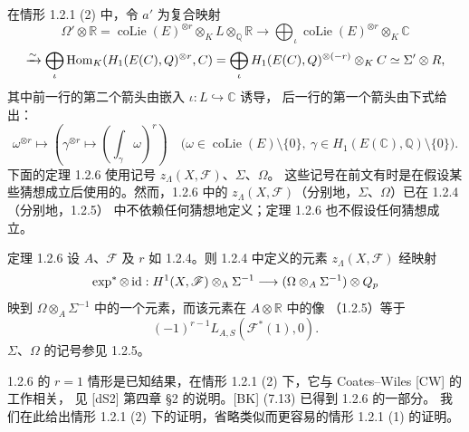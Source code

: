 在情形 1.2.1 (2) 中，令 $a'$ 为复合映射
\[
\Omega'\otimes\mathbb R=\operatorname{coLie}(E)^{\otimes r}\otimes_KL\otimes_{\mathbb Q}\mathbb R
\longrightarrow\bigoplus_\iota\operatorname{coLie}(E)^{\otimes r}\otimes_K\mathbb C
\]
\[
\xrightarrow{\sim}\bigoplus_\iota\operatorname{Hom}_K(H_1(E(C),Q)^{\otimes r},C)
=\bigoplus_\iota H_1(E(C),Q)^{\otimes(-r)}\otimes_KC
\simeq\Sigma'\otimes R,
\]
其中前一行的第二个箭头由嵌入 $\iota:L\hookrightarrow\mathbb C$ 诱导，
后一行的第一个箭头由下式给出：
\[
\omega^{\otimes r}\longmapsto
\left(\gamma^{\otimes r}\longmapsto\left(\int_\gamma\omega\right)^r\right)
\quad\bigl(\omega\in\operatorname{coLie}(E)\setminus\{0\},\ 
\gamma\in H_1(E(\mathbb C),\mathbb Q)\setminus\{0\}\bigr).
\]
下面的定理 1.2.6 使用记号 $z_\Lambda(X,\mathscr F)$、$\Sigma$、$\Omega$。
这些记号在前文有时是在假设某些猜想成立后使用的。然而，1.2.6 中的
$z_\Lambda(X,\mathscr F)$（分别地，$\Sigma$、$\Omega$）已在 1.2.4（分别地，1.2.5）
中不依赖任何猜想地定义；定理 1.2.6 也不假设任何猜想成立。
\begin{statement}{定理 1.2.6}
设 $A$、$\mathscr F$ 及 $r$ 如 1.2.4。则 1.2.4 中定义的元素
$z_\Lambda(X,\mathscr F)$ 经映射
\[
\exp^*\otimes\operatorname{id}:H^1(X,\mathscr F)\otimes_\Lambda\Sigma^{-1}
\longrightarrow(\Omega\otimes_A\Sigma^{-1})\otimes Q_p
\]
映到 $\Omega\otimes_A\Sigma^{-1}$ 中的一个元素，而该元素在 $A\otimes\mathbb R$ 中的像
（1.2.5）等于
\[
(-1)^{r-1}L_{A,S}(\mathscr F^*(1),0).
\]
$\Sigma$、$\Omega$ 的记号参见 1.2.5。
\end{statement}
1.2.6 的 $r=1$ 情形是已知结果，在情形 1.2.1 (2) 下，它与 Coates--Wiles [CW] 的工作相关，
见 [dS2] 第四章 §2 的说明。[BK] (7.13) 已得到 1.2.6 的一部分。
我们在此给出情形 1.2.1 (2) 下的证明，省略类似而更容易的情形 1.2.1 (1) 的证明。

